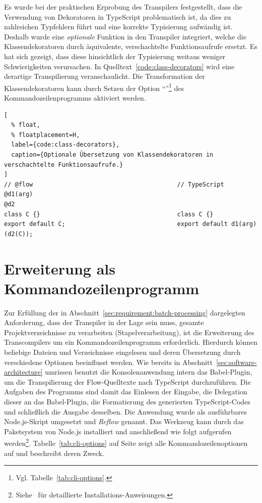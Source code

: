 Es wurde bei der praktischen Erprobung des Transpilers festgestellt, dass die Verwendung von Dekoratoren in TypeScript problematisch ist, da dies zu zahlreichen Typfehlern führt und eine korrekte Typisierung aufwändig ist. Deshalb wurde eine \emph{optionale} Funktion in den Transpiler integriert, welche die Klassendekoratoren durch äquivalente, verschachtelte Funktionsaufrufe ersetzt. Es hat sich gezeigt, dass diese hinsichtlich der Typisierung weitaus weniger Schwierigkeiten verursachen. In Quelltext~\ref{code:class-decorators} wird eine derartige Transpilierung veranschaulicht. Die Transformation der Klassendekoratoren kann durch Setzen der Option \enquote{}\footnote{Vgl. Tabelle~\ref{tab:cli-options}.} des Kommandozeilenprogramms aktiviert werden.

\begin{lstlisting}[
  % float,
  % floatplacement=H,
  label={code:class-decorators},
  caption={Optionale Übersetzung von Klassendekoratoren in verschachtelte Funktionsaufrufe.}
]
// @flow                                        // TypeScript
@d1(arg)
@d2
class C {}                                      class C {}
export default C;                               export default d1(arg)(d2(C));
\end{lstlisting}

\section{Erweiterung als Kommandozeilenprogramm}
\label{sec:cli-program}

Zur Erfüllung der in Abschnitt~\ref{sec:requirement:batch-processing} dargelegten Anforderung, dass der Transpiler in der Lage sein muss, gesamte Projektverzeichnisse zu verarbeiten (Stapelverarbeitung), ist die Erweiterung des Transcompilers um ein Kommandozeilenprogramm erforderlich. Hierdurch können beliebige Dateien und Verzeichnisse eingelesen und deren Übersetzung durch verschiedene Optionen beeinflusst werden. Wie bereits in Abschnitt~\ref{sec:software-architecture} umrissen benutzt die Konsolenanwendung intern das Babel-Plugin, um die Transpilierung der Flow-Quelltexte nach TypeScript durchzuführen. Die Aufgaben des Programms sind damit das Einlesen der Eingabe, die Delegation dieser an das Babel-Plugin, die Formatierung des generierten TypeScript-Codes und schließlich die Ausgabe desselben.
Die Anwendung wurde als ausführbares Node.js-Skript umgesetzt und \textit{Reflow} genannt. Das Werkzeug kann durch das Paketsystem von Node.js installiert und anschließend wie folgt aufgerufen werden\footnote{Siehe~\autocite{REFLOW_GITHUB} für detaillierte Installations-Anweisungen.}. Tabelle~\ref{tab:cli-options} auf Seite \pageref{tab:cli-options} zeigt alle Kommandozeilenoptionen auf und beschreibt deren Zweck.

